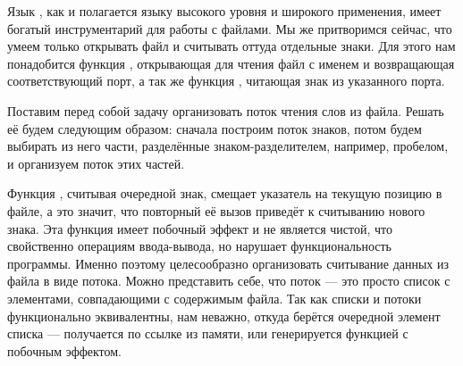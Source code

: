 Язык \Scheme, как и полагается языку высокого уровня и широкого применения, имеет богатый инструментарий для работы с файлами. Мы же притворимся сейчас, что умеем только открывать файл и считывать оттуда отдельные знаки. Для этого нам понадобится функция , открывающая для чтения файл с именем  и возвращающая соответствующий порт, а так же функция , читающая знак из указанного порта. 

Поставим перед собой задачу организовать поток чтения слов из файла. Решать её будем следующим образом: сначала построим поток знаков, потом будем выбирать из него части, разделённые знаком-разделителем, например, пробелом, и организуем поток этих частей.

Функция , считывая очередной знак, смещает указатель на текущую позицию в файле, а это значит, что повторный её вызов приведёт к считыванию нового знака. Эта функция имеет побочный эффект и не является чистой, что свойственно операциям ввода-вывода, но нарушает функциональность программы. Именно поэтому целесообразно организовать считывание данных из файла в виде потока. Можно представить себе, что поток --- это просто список с элементами, совпадающими с содержимым файла. Так как списки и потоки функционально эквивалентны, нам неважно, откуда берётся очередной элемент списка --- получается по ссылке из памяти, или генерируется функцией с побочным эффектом.

